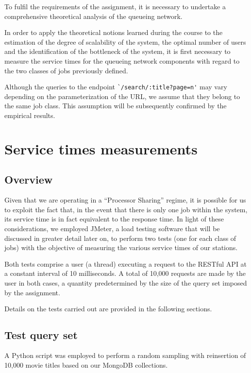 To fulfil the requirements of the assignment, it is necessary to undertake a comprehensive theoretical analysis of the queueing network.

In order to apply the theoretical notions learned during the course to the estimation of the degree of scalability of the system, the optimal number of users and the identification of the bottleneck of the system, it is first necessary to measure the service times for the queueing network components with regard to the two classes of jobs previously defined.

Although the queries to the endpoint \verb|`/search/:title?page=n'| may vary depending on the parameterization of the URL, we assume that they belong to the same job class.
This assumption will be subsequently confirmed by the empirical results.

\section{Service times measurements}

\subsection{Overview}

Given that we are operating in a ``Processor Sharing'' regime, it is possible for us to exploit the fact that, in the event that there is only one job within the system, its service time is in fact equivalent to the response time.
In light of these considerations, we employed JMeter, a load testing software that will be discussed in greater detail later on, to perform two tests (one for each class of jobs) with the objective of measuring the various service times of our stations.

Both tests comprise a user (a thread) executing a request to the RESTful API at a constant interval of 10 milliseconds.
A total of 10,000 requests are made by the user in both cases, a quantity predetermined by the size of the query set imposed by the assignment.

Details on the tests carried out are provided in the following sections.

\subsection{Test query set}

A Python script was employed to perform a random sampling with reinsertion of 10,000 movie titles based on our MongoDB collections.

